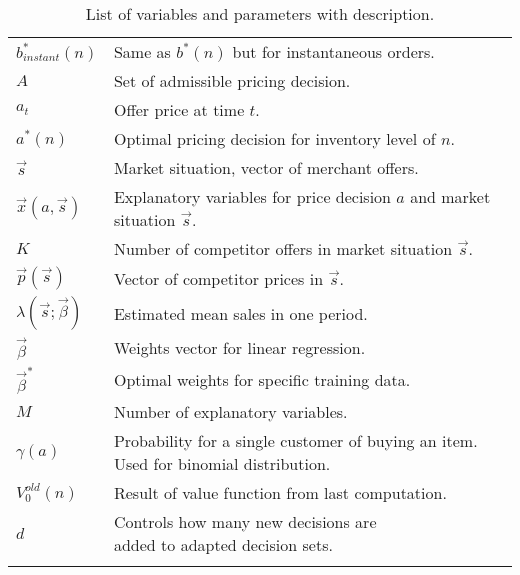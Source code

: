 \begin{longtable}{ll}
		$b^*_{instant}(n)$ & Same as $b^*(n)$ but for instantaneous orders. \\
		$A$ & Set of admissible pricing decision. \\
		$a_t$ & Offer price at time $t$. \\
		$a^*(n)$ & Optimal pricing decision for inventory level of $n$. \\
		$\vec{s}$ & Market situation, vector of merchant offers. \\
		$\vec{x}(a, \vec{s})$ & \makecell[l]{Explanatory variables for price decision $a$ \\ and market situation $\vec{s}$.} \\
		$K$ & Number of competitor offers in market situation $\vec{s}$. \\
		$\vec{p}(\vec{s})$ & Vector of competitor prices in $\vec{s}$. \\
		$\lambda(\vec{s}; \vec{\beta})$ & Estimated mean sales in one period. \\
		$\vec{\beta}$ & Weights vector for linear regression. \\
		$\vec{\beta}^*$ & Optimal weights for specific training data. \\
		$M$ & Number of explanatory variables. \\
		$\gamma(a)$ & \makecell[l]{Probability for a single customer of buying an item. \\ Used for binomial distribution.} \\
		$V_0^{old}(n)$ & Result of value function from last computation. \\
		$d$ & \makecell[l]{Controls how many new decisions are \\ added to adapted decision sets.} \\
		\bottomrule
	\caption[List of Variables and Parameters]{List of variables and parameters with description.}
	\label{tab:notations}
\end{longtable}
